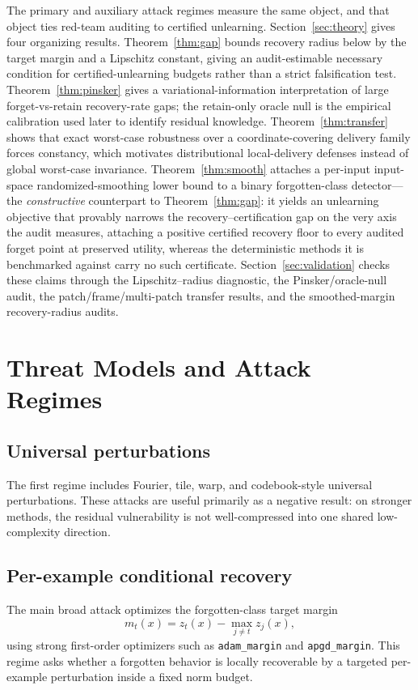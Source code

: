 \documentclass[11pt]{article}
\begin{document}
The primary and auxiliary attack regimes measure the same object, and that object ties red-team auditing to certified unlearning. Section~\ref{sec:theory} gives four organizing results. Theorem~\ref{thm:gap} bounds recovery radius below by the target margin and a Lipschitz constant, giving an audit-estimable necessary condition for certified-unlearning budgets rather than a strict falsification test. Theorem~\ref{thm:pinsker} gives a variational-information interpretation of large forget-vs-retain recovery-rate gaps; the retain-only oracle null is the empirical calibration used later to identify residual knowledge. Theorem~\ref{thm:transfer} shows that exact worst-case robustness over a coordinate-covering delivery family forces constancy, which motivates distributional local-delivery defenses instead of global worst-case invariance. Theorem~\ref{thm:smooth} attaches a per-input input-space randomized-smoothing lower bound to a binary forgotten-class detector---the \emph{constructive} counterpart to Theorem~\ref{thm:gap}: it yields an unlearning objective that provably narrows the recovery--certification gap on the very axis the audit measures, attaching a positive certified recovery floor to every audited forget point at preserved utility, whereas the deterministic methods it is benchmarked against carry no such certificate. Section~\ref{sec:validation} checks these claims through the Lipschitz--radius diagnostic, the Pinsker/oracle-null audit, the patch/frame/multi-patch transfer results, and the smoothed-margin recovery-radius audits.

\section{Threat Models and Attack Regimes}
\subsection{Universal perturbations}
The first regime includes Fourier, tile, warp, and codebook-style universal perturbations. These attacks are useful primarily as a negative result: on stronger methods, the residual vulnerability is not well-compressed into one shared low-complexity direction.

\subsection{Per-example conditional recovery}
The main broad attack optimizes the forgotten-class target margin
\begin{equation}
  m_t(x) = z_t(x) - \max_{j \neq t} z_j(x),
\end{equation}
using strong first-order optimizers such as \texttt{adam\_margin} and \texttt{apgd\_margin}. This regime asks whether a forgotten behavior is locally recoverable by a targeted per-example perturbation inside a fixed norm budget.
\end{document}
